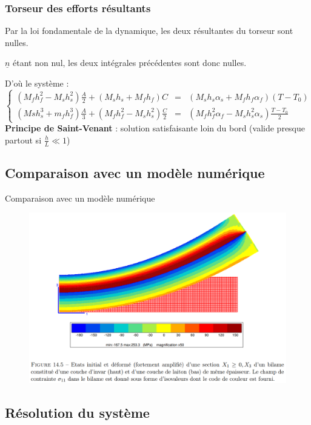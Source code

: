 \begin{frame}
    \frametitle{Torseur des efforts résultants}
    Par la loi fondamentale de la dynamique, les deux résultantes du torseur sont nulles.
    
    $\underline{n}$ étant non nul, les deux intégrales précédentes sont donc nulles.
    
    D'où le système :
    $$
    \left \{
    \begin{array}{rcl}
    (M_fh_f^{2}-M_sh_s^{2})\frac{A}{2}+(M_sh_s+M_fh_f)C&=&(M_sh_s\alpha_s+M_fh_f\alpha_f)(T-T_0) \\
    (Msh_s^{3}+m_fh_f^{3})\frac{A}{3}+(M_fh_f^{2}-M_sh_s^{2})\frac{C}{2}&=&(M_fh_f^{2}\alpha_f-M_sh_s^{2}\alpha_s)\frac{T-T_0}{2}
    \end{array}
    \right.
    $$
    \textbf{Principe de Saint-Venant} : solution satisfaisante loin du bord (valide presque partout si $\frac{h}{L}\ll1$)
\end{frame}

\subsection{Comparaison avec un modèle numérique}

\begin{frame}{Comparaison avec un modèle numérique}
    \begin{figure}
        \centering
        \includegraphics[scale=0.5]{imgs/simul_num.png}
    \end{figure}
\end{frame}

\subsection{Résolution du système}

